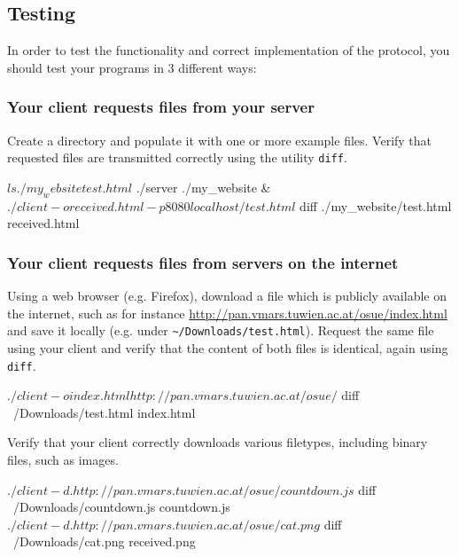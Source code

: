 \clearpage
\subsection*{Testing}

In order to test the functionality and correct implementation of the protocol,
you should test your programs in 3 different ways:

\vspace{-4mm}

\subsubsection*{Your client requests files from your server}

\vspace{-4mm}
Create a directory and populate it with one or more example files.
Verify that requested files are transmitted correctly
using the utility \verb|diff|.

\begin{osuefmtcode}
    $ ls ./my_website
    test.html
    $ ./server ./my_website &
    $ ./client -o received.html -p 8080 localhost/test.html
    $ diff ./my_website/test.html received.html
\end{osuefmtcode}

\subsubsection*{Your client requests files from servers on the internet}

\vspace{-4mm}
Using a web browser (e.g. Firefox),
download a file which is publicly available on the internet,
such as for instance \url{http://pan.vmars.tuwien.ac.at/osue/index.html}
and save it locally (e.g. under \verb|~/Downloads/test.html|).
Request the same file using your client
and verify that the content of both files is identical,
again using \verb|diff|.

\begin{osuefmtcode}
    $ ./client -o index.html http://pan.vmars.tuwien.ac.at/osue/
    $ diff ~/Downloads/test.html index.html
\end{osuefmtcode}

Verify that your client correctly downloads various filetypes,
including binary files, such as images.

\begin{osuefmtcode}
    $ ./client -d . http://pan.vmars.tuwien.ac.at/osue/countdown.js
    $ diff ~/Downloads/countdown.js countdown.js
    $ ./client -d . http://pan.vmars.tuwien.ac.at/osue/cat.png
    $ diff ~/Downloads/cat.png received.png
\end{osuefmtcode}

